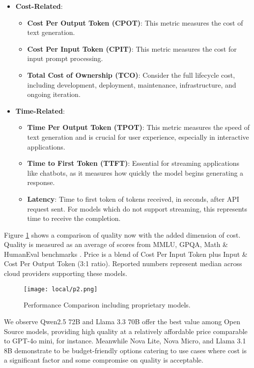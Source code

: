 \begin{itemize}
    \item \textbf{Cost-Related}:
    \begin{itemize}
        \item \textbf{Cost Per Output Token (CPOT)}: This metric measures the cost of text generation.
        \item \textbf{Cost Per Input Token (CPIT)}: This metric measures the cost for input prompt processing.
        \item \textbf{Total Cost of Ownership (TCO)}: Consider the full lifecycle cost, including development, deployment, maintenance, infrastructure, and ongoing iteration.
    \end{itemize}
    \item \textbf{Time-Related}:
    \begin{itemize}
        \item \textbf{Time Per Output Token (TPOT)}: This metric measures the speed of text generation and is crucial for user experience, especially in interactive applications.
        \item \textbf{Time to First Token (TTFT)}: Essential for streaming applications like chatbots, as it measures how quickly the model begins generating a response.
        \item \textbf{Latency}: Time to first token of tokens received, in seconds, after API request sent. For models which do not support streaming, this represents time to receive the completion.
    \end{itemize}
\end{itemize}

Figure \ref{fig:p2} shows a comparison of quality now with the added dimension of cost. Quality is measured as an average of scores from MMLU, GPQA, Math \& HumanEval benchmarks \cite{artificialanalysis2024methodology}. Price is a blend of Cost Per Input Token plus Input \& Cost Per Output Token (3:1 ratio). Reported numbers represent median across cloud providers \cite{artificialanalysis2024providers} supporting these models.

\begin{figure}[H]
\centering
\texttt{[image: local/p2.png]}
\caption{Performance Comparison including proprietary models.}
\label{fig:p2}
\end{figure}

We observe Qwen2.5 72B and Llama 3.3 70B offer the best value among Open Source models, providing high quality at a relatively affordable price comparable to GPT-4o mini, for instance. Meanwhile Nova Lite, Nova Micro, and Llama 3.1 8B demonstrate to be budget-friendly options catering to use cases where cost is a significant factor and some compromise on quality is acceptable.

